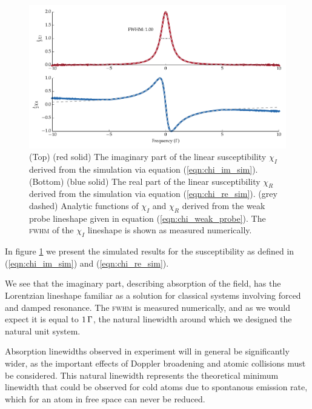     \begin{figure}[]
    \includegraphics[width=\linewidth]
      {figs/02_propagation/two_mb_solve_f03_fig5.pdf}
    \caption{
    (Top) (red solid) The imaginary part of the linear susceptibility $\chi_I$
    derived from the simulation via equation (\ref{eqn:chi_im_sim}). (Bottom)
    (blue solid) The real part of the linear susceptibility $\chi_R$ derived from
    the simulation via equation (\ref{eqn:chi_re_sim}). (grey dashed) Analytic
    functions of $\chi_I$ and $\chi_R$ derived from the weak probe lineshape given
    in equation (\ref{eqn:chi_weak_probe}). The \textsc{fwhm} of the $\chi_I$
    lineshape is shown as measured numerically.
    }
    \label{fig:susc_imag_real_linear_comp}
    \end{figure}

    In figure \ref{fig:susc_imag_real_linear_comp} we present the simulated
    results for the susceptibility as defined in (\ref{eqn:chi_im_sim}) and
    (\ref{eqn:chi_re_sim}).

    We see that the imaginary part, describing absorption of the field, has the
    Lorentzian lineshape familiar as a solution for classical systems involving
    forced and damped resonance. The \textsc{fwhm} is measured numerically, and
    as we would expect it is equal to $\unit[1]{\Gamma}$, the natural linewidth
    around which we designed the natural unit system.

    Absorption linewidths observed in experiment will in general be
    significantly wider, as the important effects of Doppler broadening and
    atomic collisions must be considered. This natural linewidth represents the
    theoretical minimum linewidth that could be observed for cold atoms due to
    spontanous emission rate, which for an atom in free space can never be
    reduced.\cite{loudon2000quantum}

